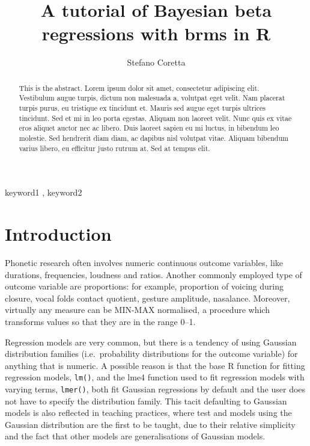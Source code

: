 \documentclass[
  authoryear,
  preprint,
  3p]{elsarticle}
\begin{document}
\begin{frontmatter}
\title{A tutorial of Bayesian beta regressions with brms in R}
\author[1]{Stefano Coretta%
%
}


        
\begin{abstract}
This is the abstract. Lorem ipsum dolor sit amet, consectetur adipiscing
elit. Vestibulum augue turpis, dictum non malesuada a, volutpat eget
velit. Nam placerat turpis purus, eu tristique ex tincidunt et. Mauris
sed augue eget turpis ultrices tincidunt. Sed et mi in leo porta
egestas. Aliquam non laoreet velit. Nunc quis ex vitae eros aliquet
auctor nec ac libero. Duis laoreet sapien eu mi luctus, in bibendum leo
molestie. Sed hendrerit diam diam, ac dapibus nisl volutpat vitae.
Aliquam bibendum varius libero, eu efficitur justo rutrum at. Sed at
tempus elit.
\end{abstract}





\begin{keyword}
    keyword1 \sep 
    keyword2
\end{keyword}
\end{frontmatter}
    

\section{Introduction}\label{introduction}

Phonetic research often involves numeric continuous outcome variables,
like durations, frequencies, loudness and ratios. Another commonly
employed type of outcome variable are proportions: for example,
proportion of voicing during closure, vocal folds contact quotient,
gesture amplitude, nasalance. Moreover, virtually any measure can be
MIN-MAX normalised, a procedure which transforms values so that they are
in the range 0--1.

Regression models are very common, but there is a tendency of using
Gaussian distribution families (i.e.~probability distributions for the
outcome variable) for anything that is numeric. A possible reason is
that the base R function for fitting regression models, \texttt{lm()},
and the lme4 function used to fit regression models with varying terms,
\texttt{lmer()}, both fit Gaussian regressions by default and the user
does not have to specify the distribution family. This tacit defaulting
to Gaussian models is also reflected in teaching practices, where test
and models using the Gaussian distribution are the first to be taught,
due to their relative simplicity and the fact that other models are
generalisations of Gaussian models.
\end{document}
